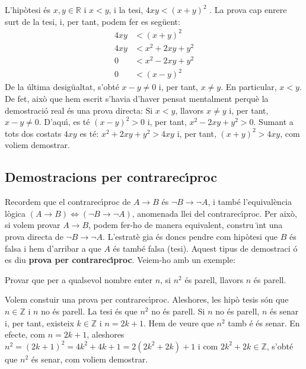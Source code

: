 \begin{solucio}
L'hip\`{o}tesi \'{e}s $x,y\in\mathbb{R}$ i $x<y$, i la tesi, $4xy<(x+y)^{2}$%
. La prova cap enrere surt de la tesi, i, per tant, podem fer es seg\"{u}ent:%
\begin{align*}
4xy & <(x+y)^{2} \\
4xy & <x^{2}+2xy+y^{2} \\
0 & <x^{2}-2xy+y^{2} \\
0 & <(x-y)^{2}
\end{align*}
De la \'{u}ltima desig\"{u}altat, s'obt\'{e} $x-y\neq0$ i, per tant, $x\neq y
$. En particular, $x<y$. De fet, aix\`{o} que hem escrit s'havia d'haver
pensat mentalment perqu\`{e} la demostraci\'{o} real \'{e}s una prova
directa: Si $x<y$, llavors $x\neq y$ i, per tant, $x-y\neq0$. D'aqu\'{\i},
es t\'{e} $(x-y)^{2}>0$ i, per tant, $x^{2}-2xy+y^{2}>0$. Sumant a tots dos
costats $4xy$ es t\'{e}: $x^{2}+2xy+y^{2}>4xy$ i, per tant, $(x+y)^{2}>4xy$,
com voliem demostrar.
\end{solucio}

\subsection{Demostracions per contrarec\'{\i}proc}

Recordem que el contrarec\'{\i}proc de $A\longrightarrow B$ \'{e}s $\lnot
B\longrightarrow\lnot A$, i tamb\'{e} l'equival\`{e}ncia l\`{o}gica $\left(
A\longrightarrow B\right) \Longleftrightarrow\left( \lnot B\longrightarrow
\lnot A\right) $, anomenada llei del contrarec\'{\i}proc. Per aix\`{o}, si
volem provar $A\longrightarrow B$, podem fer-ho de manera equivalent, constru%
\"{\i}nt una prova directa de $\lnot B\longrightarrow\lnot A$. L'estrat\`{e}%
gia \'{e}s doncs pendre com hip\`{o}tesi que $B$ \'{e}s falsa i hem
d'arribar a que $A$ \'{e}s tamb\'{e} falsa (tesi). Aquest tipus de demostraci%
\'{o} es diu \textbf{prova per contrarec\'{\i}proc}. Veiem-ho amb un exemple:

\begin{exemple}
\label{3}Provar que per a qualsevol nombre enter $n$, si $n^{2}$ \'{e}s
parell, llavors $n$ \'{e}s parell.
\end{exemple}

\begin{solucio}
Volem constuir una prova per contrarec\'{\i}proc. Aleshores, les hip\`{o}%
tesis s\'{o}n que $n\in\mathbb{Z}$ i $n$ no \'{e}s parell. La tesi \'{e}s
que $n^{2}$ no \'{e}s parell. Si $n$ no \'{e}s parell, $n$ \'{e}s senar i,
per tant, existeix $k\in\mathbb{Z}$ i $n=2k+1$. Hem de veure que $n^{2}$ tamb%
\'{e} \'{e}s senar. En efecte, com $n=2k+1$, aleshores $n^{2}=\left(
2k+1\right) ^{2}=4k^{2}+4k+1=2\left( 2k^{2}+2k\right) +1$ i com $2k^{2}+2k\in%
\mathbb{Z}$, s'obt\'{e} que $n^{2}$ \'{e}s senar, com voliem demostrar.
\end{solucio}

